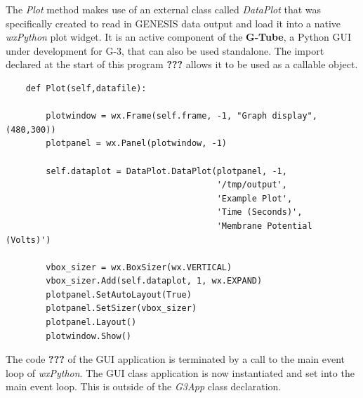 \documentclass[12pt]{article}
\begin{document}
The {\it Plot} method makes use of an external class called {\it DataPlot} that
was specifically created to read in GENESIS data output and load 
it into a native {\it wxPython} plot widget. It is an active component of
the {\bf G-Tube}, a Python GUI under development for G-3, that can 
also be used standalone. The import declared at the start of this 
program {\bf ???} allows it to be used as a callable object. 

{\footnotesize
  \resetlinenumber[57]
  \linenumbers
\begin{verbatim} 
    def Plot(self,datafile):

        plotwindow = wx.Frame(self.frame, -1, "Graph display", (480,300))
        plotpanel = wx.Panel(plotwindow, -1)

        self.dataplot = DataPlot.DataPlot(plotpanel, -1,
                                          '/tmp/output',
                                          'Example Plot',
                                          'Time (Seconds)',
                                          'Membrane Potential (Volts)')

        vbox_sizer = wx.BoxSizer(wx.VERTICAL)
        vbox_sizer.Add(self.dataplot, 1, wx.EXPAND)
        plotpanel.SetAutoLayout(True)
        plotpanel.SetSizer(vbox_sizer)
        plotpanel.Layout()
        plotwindow.Show()
\end{verbatim}
}


    

The code {\bf ???} of the GUI application is terminated by a call to the main
event loop of {\it wxPython}.  The GUI class application is now instantiated and set
into the main event loop. This is outside of the {\it G3App} class
declaration.

\end{document}
